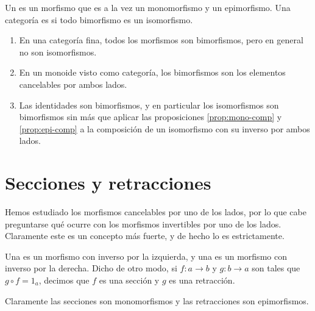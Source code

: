 \begin{definition}
  Un  es un morfismo que es a la vez un monomorfismo y un
  epimorfismo. Una categoría es  si todo bimorfismo es un
  isomorfismo.
\end{definition}

\begin{example}\;
  \begin{enumerate}
  \item En una categoría fina, todos los morfismos son bimorfismos, pero en
    general no son isomorfismos.
  \item En un monoide visto como categoría, los bimorfismos son los elementos
    cancelables por ambos lados.
  \item Las identidades son bimorfismos, y en particular los isomorfismos son
    bimorfismos sin más que aplicar las proposiciones \ref{prop:mono-comp} y
    \ref{prop:epi-comp} a la composición de un isomorfismo con su inverso por
    ambos lados.
  \end{enumerate}
\end{example}

\section{Secciones y retracciones}

Hemos estudiado los morfismos cancelables por uno de los lados, por lo que cabe
preguntarse qué ocurre con los morfismos invertibles por uno de los
lados. Claramente este es un concepto más fuerte, y de hecho lo es
estrictamente.

\begin{definition}
  Una  es un morfismo con inverso por la izquierda, y una
   es un morfismo con inverso por la derecha.  Dicho de otro
  modo, si $f:a\to b$ y $g:b\to a$ son tales que $g\circ f=1_a$, decimos que $f$
  es una sección y $g$ es una retracción.
\end{definition}

Claramente las secciones son monomorfismos y las retracciones son
epimorfismos.

